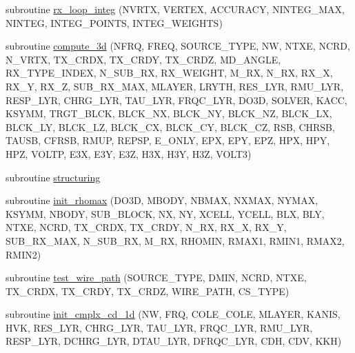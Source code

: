 \begin{DoxyCompactItemize}
\item 
subroutine \hyperlink{Marco_8f90_aa1520a05c04ebda2383af68c66824efe}{rx\+\_\+loop\+\_\+integ} (N\+V\+R\+TX, V\+E\+R\+T\+EX, A\+C\+C\+U\+R\+A\+CY, N\+I\+N\+T\+E\+G\+\_\+\+M\+AX, N\+I\+N\+T\+EG, I\+N\+T\+E\+G\+\_\+\+P\+O\+I\+N\+TS, I\+N\+T\+E\+G\+\_\+\+W\+E\+I\+G\+H\+TS)
\item 
subroutine \hyperlink{Marco_8f90_ad063b38dcbfa2382a1ed3380c8e53381}{compute\+\_\+3d} (N\+F\+RQ, F\+R\+EQ, S\+O\+U\+R\+C\+E\+\_\+\+T\+Y\+PE, NW, N\+T\+XE, N\+C\+RD, N\+\_\+\+V\+R\+TX, T\+X\+\_\+\+C\+R\+DX, T\+X\+\_\+\+C\+R\+DY, T\+X\+\_\+\+C\+R\+DZ, M\+D\+\_\+\+A\+N\+G\+LE, R\+X\+\_\+\+T\+Y\+P\+E\+\_\+\+I\+N\+D\+EX, N\+\_\+\+S\+U\+B\+\_\+\+RX, R\+X\+\_\+\+W\+E\+I\+G\+HT, M\+\_\+\+RX, N\+\_\+\+RX, R\+X\+\_\+X, R\+X\+\_\+Y, R\+X\+\_\+Z, S\+U\+B\+\_\+\+R\+X\+\_\+\+M\+AX, M\+L\+A\+Y\+ER, L\+R\+Y\+TH, R\+E\+S\+\_\+\+L\+YR, R\+M\+U\+\_\+\+L\+YR, R\+E\+S\+P\+\_\+\+L\+YR, C\+H\+R\+G\+\_\+\+L\+YR, T\+A\+U\+\_\+\+L\+YR, F\+R\+Q\+C\+\_\+\+L\+YR, D\+O3D, S\+O\+L\+V\+ER, K\+A\+CC, K\+S\+Y\+MM, T\+R\+G\+T\+\_\+\+B\+L\+CK, B\+L\+C\+K\+\_\+\+NX, B\+L\+C\+K\+\_\+\+NY, B\+L\+C\+K\+\_\+\+NZ, B\+L\+C\+K\+\_\+\+LX, B\+L\+C\+K\+\_\+\+LY, B\+L\+C\+K\+\_\+\+LZ, B\+L\+C\+K\+\_\+\+CX, B\+L\+C\+K\+\_\+\+CY, B\+L\+C\+K\+\_\+\+CZ, R\+SB, C\+H\+R\+SB, T\+A\+U\+SB, C\+F\+R\+SB, R\+M\+UP, R\+E\+P\+SP, E\+\_\+\+O\+N\+LY, E\+PX, E\+PY, E\+PZ, H\+PX, H\+PY, H\+PZ, V\+O\+L\+TP, E3X, E3Y, E3Z, H3X, H3Y, H3Z, V\+O\+L\+T3)
\item 
subroutine \hyperlink{Marco_8f90_a1f88ff0025ad4aee3032c5278cf5a243}{structuring}
\item 
subroutine \hyperlink{Marco_8f90_a0ba9e9f35837a34d8df25a815723376a}{init\+\_\+rhomax} (D\+O3D, M\+B\+O\+DY, N\+B\+M\+AX, N\+X\+M\+AX, N\+Y\+M\+AX, K\+S\+Y\+MM, N\+B\+O\+DY, S\+U\+B\+\_\+\+B\+L\+O\+CK, NX, NY, X\+C\+E\+LL, Y\+C\+E\+LL, B\+LX, B\+LY, N\+T\+XE, N\+C\+RD, T\+X\+\_\+\+C\+R\+DX, T\+X\+\_\+\+C\+R\+DY, N\+\_\+\+RX, R\+X\+\_\+X, R\+X\+\_\+Y, S\+U\+B\+\_\+\+R\+X\+\_\+\+M\+AX, N\+\_\+\+S\+U\+B\+\_\+\+RX, M\+\_\+\+RX, R\+H\+O\+M\+IN, R\+M\+A\+X1, R\+M\+I\+N1, R\+M\+A\+X2, R\+M\+I\+N2)
\item 
subroutine \hyperlink{Marco_8f90_afcc3a0e809d5eef600ba9aeb1417a18f}{test\+\_\+wire\+\_\+path} (S\+O\+U\+R\+C\+E\+\_\+\+T\+Y\+PE, D\+M\+IN, N\+C\+RD, N\+T\+XE, T\+X\+\_\+\+C\+R\+DX, T\+X\+\_\+\+C\+R\+DY, T\+X\+\_\+\+C\+R\+DZ, W\+I\+R\+E\+\_\+\+P\+A\+TH, C\+S\+\_\+\+T\+Y\+PE)
\item 
subroutine \hyperlink{Marco_8f90_ab5e1d6b86ed64b774c25c5b69552f078}{init\+\_\+cmplx\+\_\+cd\+\_\+1d} (NW, F\+RQ, C\+O\+L\+E\+\_\+\+C\+O\+LE, M\+L\+A\+Y\+ER, K\+A\+N\+IS, H\+VK, R\+E\+S\+\_\+\+L\+YR, C\+H\+R\+G\+\_\+\+L\+YR, T\+A\+U\+\_\+\+L\+YR, F\+R\+Q\+C\+\_\+\+L\+YR, R\+M\+U\+\_\+\+L\+YR, R\+E\+S\+P\+\_\+\+L\+YR, D\+C\+H\+R\+G\+\_\+\+L\+YR, D\+T\+A\+U\+\_\+\+L\+YR, D\+F\+R\+Q\+C\+\_\+\+L\+YR, C\+DH, C\+DV, K\+KH)

\end{DoxyCompactItemize}
